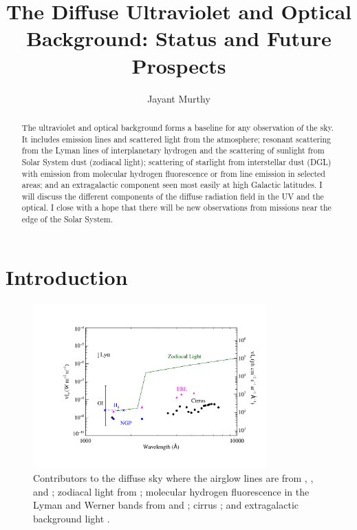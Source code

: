 \documentclass{iau}
\title[The Diffuse UV/Optical Background] %
{The Diffuse Ultraviolet and Optical Background: Status and Future Prospects}
\author[Jayant Murthy]   %
{Jayant Murthy}
\affiliation{Indian Institute of Astrophysics, \\ Bengaluru 560 034 \\ email: {\tt jmurthy@yahoo.com}}
\begin{document}
\maketitle

\begin{abstract}
The ultraviolet and optical background forms a baseline for any observation of the sky. It includes emission lines and scattered light from the atmosphere; resonant scattering from the Lyman lines of interplanetary hydrogen and the scattering of sunlight from Solar System dust (zodiacal light); scattering of starlight from interstellar dust (DGL) with emission from molecular hydrogen fluorescence or from line emission in selected areas; and an extragalactic component seen most easily at high Galactic latitudes. I will discuss the different components of the diffuse radiation field in the UV and the optical. I close with a hope that there will be new observations from missions near the edge of the Solar System.
\end{abstract}

\firstsection %

\section{Introduction}

\begin{figure}[b]
\begin{center}
 \includegraphics[width=0.8\textwidth]{diffuse_sources.pdf} 
 \caption{Contributors to the diffuse sky where the airglow lines are from \citet{Brune1978}, \citet{Meier1991}, and \citet{Leinert1998}; zodiacal light from \citet{Leinert1998}; molecular hydrogen fluorescence in the Lyman and Werner bands from \citet{Jo2017} and \citet{Akshaya2018}; cirrus \citep{Mattila1979, Mattila1990, Haikala1995, Akshaya2018}; and extragalactic background light \citep{Mattila2017, Akshaya2018}.}
  \label{Fig:diffuse_contributors}
\end{center}
\end{figure}
\end{document}
